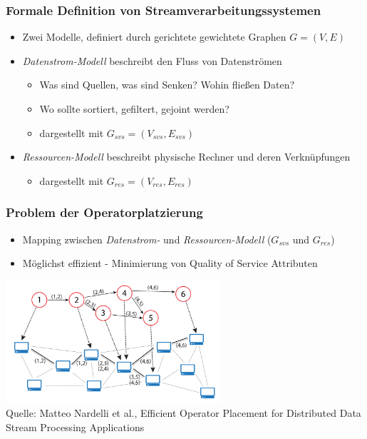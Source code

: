\documentclass{beamer}
\begin{document}
\begin{frame}
\frametitle{Formale Definition von Streamverarbeitungssystemen}
\begin{itemize}
    \item Zwei Modelle, definiert durch gerichtete gewichtete Graphen $G= (V,E)$
    \item \textit{Datenstrom-Modell} beschreibt den Fluss von Datenströmen
    \begin{itemize}
        \item Was sind Quellen, was sind Senken? Wohin fließen Daten?
        \item Wo sollte sortiert, gefiltert, gejoint werden?
        \item dargestellt mit $G_{svs} = (V_{svs}, E_{svs})$
    \end{itemize}
    \item \textit{Ressourcen-Modell} beschreibt physische Rechner und deren Verknüpfungen
    \begin{itemize}
        \item dargestellt mit $G_{res} = (V_{res}, E_{res})$
    \end{itemize}
\end{itemize}
\end{frame}

\begin{frame}
\frametitle{Problem der Operatorplatzierung}
\begin{itemize}
    \item Mapping zwischen \textit{Datenstrom- } und \textit{Ressourcen-Modell} ($G_{svs}$ und $G_{res}$)
    \item Möglichst effizient - Minimierung von Quality of Service Attributen
\end{itemize}
\begin{center}
    \includegraphics[width=0.6\textwidth]{res/OPP-graph.png} \\
    \tiny \color{gray} Quelle: Matteo Nardelli et al., Efficient Operator Placement for Distributed Data Stream Processing Applications
\end{center}
\end{frame}
\end{document}
